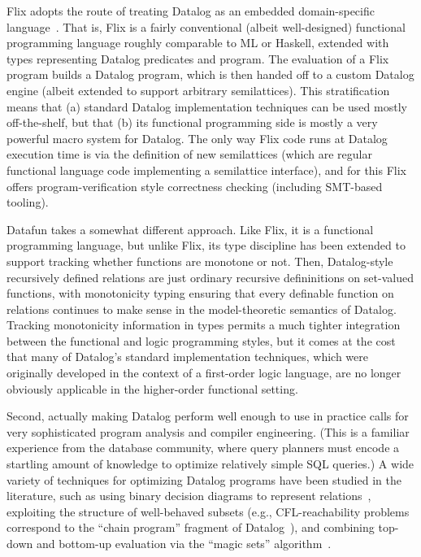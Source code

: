 Flix adopts the route of treating Datalog as an embedded
domain-specific language~\cite{edsl}. That is, Flix is a fairly
conventional (albeit well-designed) functional programming language
roughly comparable to ML or Haskell, extended with types representing
Datalog predicates and program. The evaluation of a Flix program
builds a Datalog program, which is then handed off to a custom Datalog
engine (albeit extended to support arbitrary semilattices).  This
stratification means that (a) standard Datalog implementation
techniques can be used mostly off-the-shelf, but that (b) its
functional programming side is mostly a very powerful macro system for
Datalog.  The only way Flix code runs at Datalog execution time is via
the definition of new semilattices (which are regular functional
language code implementing a semilattice interface), and for this Flix
offers program-verification style correctness checking (including
SMT-based tooling).

Datafun takes a somewhat different approach. Like Flix, it is a
functional programming language, but unlike Flix, its type discipline
has been extended to support tracking whether functions are monotone
or not. Then, Datalog-style recursively defined relations are just
ordinary recursive defininitions on set-valued functions, with
monotonicity typing ensuring that every definable function on
relations continues to make sense in the model-theoretic semantics of
Datalog. Tracking monotonicity information in types permits a much
tighter integration between the functional and logic programming
styles, but it comes at the cost that many of Datalog's standard
implementation techniques, which were originally developed in the
context of a first-order logic language, are no longer obviously
applicable in the higher-order functional setting.

Second, actually
making Datalog perform well enough to use in practice calls for very
sophisticated program analysis and compiler engineering. (This is a
familiar experience from the database community, where query planners
must encode a startling amount of knowledge to optimize relatively
simple SQL queries.) A wide variety of techniques for optimizing
Datalog programs have been studied in the literature, such as using
binary decision diagrams to represent relations~\cite{whaley-phd},
exploiting the structure of well-behaved subsets (e.g.,
CFL-reachability problems correspond to the ``chain program'' fragment
of Datalog~\cite{chain-programs}), and combining top-down and
bottom-up evaluation via the ``magic sets''
algorithm~\cite{magic-sets}.

